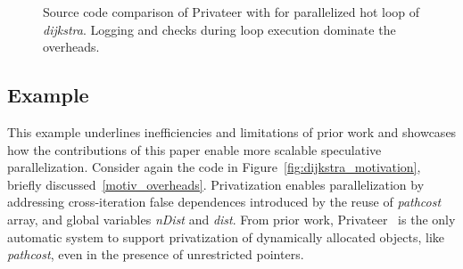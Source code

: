 \begin{figure}[!b]
\centering
\scriptsize
{}
\caption{Source code comparison of Privateer with \name for parallelized hot loop
of \textit{dijkstra}. Logging and checks
during loop execution dominate the overheads.}
\label{fig:dijkstra_motivation_comparison_source_code}
\end{figure}


\subsection{Example}
\label{motiv_example}

This example underlines inefficiencies and limitations of prior work
and showcases how the contributions of this paper enable more scalable
speculative parallelization.
%
Consider again the code in Figure~\ref{fig:dijkstra_motivation},
briefly discussed~\ref{motiv_overheads}.
%
Privatization enables parallelization by addressing cross-iteration
false dependences introduced by the reuse of \textit{pathcost} array,
and global variables \textit{nDist} and \textit{dist}.
%
From prior work, Privateer~\cite{johnson:12:pldi} is the only
automatic system to support privatization of dynamically allocated
objects, like \textit{pathcost}, even in the presence of unrestricted
pointers.

